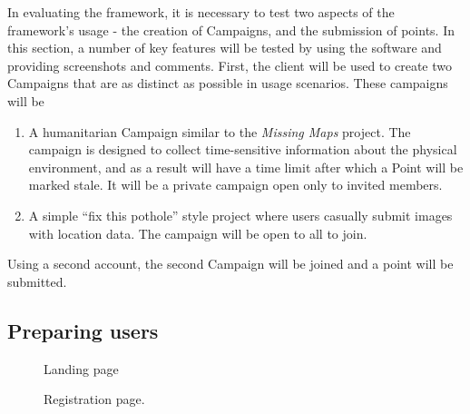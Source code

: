 \documentclass{article}
\begin{document}
		In evaluating the framework, it is necessary to test two aspects of the framework's usage - the creation of Campaigns, and the submission of points. In this section, a number of key features will be tested by using the software and providing screenshots and comments. First, the client will be used to create two Campaigns that are as distinct as possible in usage scenarios. These campaigns will be

		\begin{enumerate}[label=\Alph*.]
			\item A humanitarian Campaign similar to the \emph{Missing Maps} project. The campaign is designed to collect time-sensitive information about the physical environment, and as a result will have a time limit after which a Point will be marked stale. It will be a private campaign open only to invited members.
			\item A simple ``fix this pothole'' style project where users casually submit images with location data. The campaign will be open to all to join.
		\end{enumerate}

		Using a second account, the second Campaign will be joined and a point will be submitted.

		\subsection{Preparing users}

		\begin{figure}[ht]
			\centering
			\caption{Landing page}
			\label{fig:eval-prep-1}
		\end{figure}

		\begin{figure}[ht]
			\centering
			\caption{Registration page.}
			\label{fig:eval-prep-2}
		\end{figure}
\end{document}
